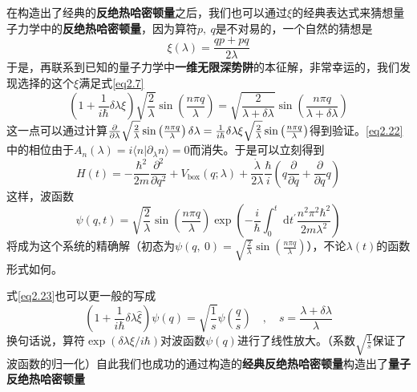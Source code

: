 在构造出了经典的\textbf{反绝热哈密顿量}之后，我们也可以通过$\xi$的经典表达式来猜想量子力学中的\textbf{反绝热哈密顿量}，因为算符$p,\ q$是不对易的，一个自然的猜想是
\begin{equation}
    \xi(\lambda) = \frac{q p + p q}{2 \lambda}
    \label{eq2.21}
\end{equation}
于是，再联系到已知的量子力学中\textbf{一维无限深势阱}的本征解，非常幸运的，我们发现选择的这个$\xi$满足式\eqref{eq2.7}
\begin{equation}
    \left(1+\frac{1}{i \hbar} \delta \lambda \xi \right) \sqrt{\frac{2}{\lambda}} \sin \left(\frac{n \pi q}{\lambda}\right)=\sqrt{\frac{2}{\lambda+\delta \lambda}} \sin \left(\frac{n \pi q}{\lambda+\delta \lambda}\right)
    \label{eq2.22}
\end{equation}
这一点可以通过计算$\frac{\partial }{\partial \lambda} \sqrt{\frac{2}{\lambda}} \sin \left(\frac{n \pi q}{\lambda}\right) \delta \lambda = \frac{1}{i \hbar} \delta \lambda \xi \sqrt{\frac{2}{\lambda}} \sin \left(\frac{n \pi q}{\lambda}\right)$得到验证。\eqref{eq2.22}中的相位由于$A_{n}(\lambda)=i\langle n | \partial_\lambda  n\rangle = 0$而消失。于是可以立刻得到
\begin{equation}
    H(t)=-\frac{\hbar^{2}}{2 m} \frac{\partial^{2}}{\partial q^{2}}+V_{\mathrm{box}}(q ; \lambda)+\frac{\dot{\lambda}}{2 \lambda} \frac{\hbar}{i}\left(q \frac{\partial}{\partial q}+\frac{\partial}{\partial q} q\right)
    \label{eq2.23}
\end{equation}
这样，波函数
\begin{equation}
    \psi (q, t)=\sqrt{\frac{2}{\lambda}} \sin \left(\frac{n \pi q}{\lambda}\right) \exp \left(-\frac{i}{\hbar} \int_{0}^{t} \mathrm{~d} t^{\prime} \frac{n^{2} \pi^{2} \hbar^{2}}{2 m \lambda^{2}}\right)
    \label{eq2.24}
\end{equation}
将成为这个系统的精确解（初态为$\psi (q,\ 0) = \sqrt{\frac{2}{\lambda}} \sin \left(\frac{n \pi q}{\lambda}\right)$），不论$\lambda(t)$的函数形式如何。

式\eqref{eq2.23}也可以更一般的写成
\begin{equation}
    \left(1+\frac{1}{i \hbar} \delta \lambda \hat{\xi}\right) \psi(q)=\sqrt{\frac{1}{s}} \psi\left(\frac{q}{s}\right) \quad, \quad s=\frac{\lambda+\delta \lambda}{\lambda}
    \label{eq2.25}
\end{equation}
换句话说，算符$\exp (\delta \lambda \xi / i \hbar)$对波函数$\psi(q)$进行了线性放大。（系数$\sqrt{\frac{1}{s}}$保证了波函数的归一化）自此我们也成功的通过构造的\textbf{经典反绝热哈密顿量}构造出了\textbf{量子反绝热哈密顿量}

